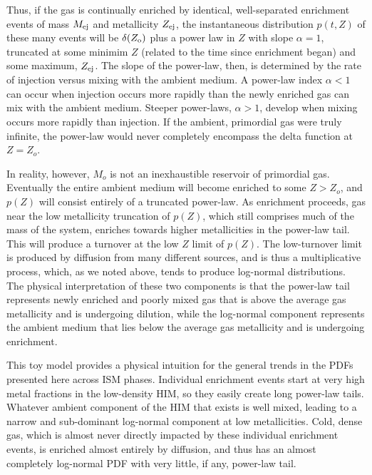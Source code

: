 Thus, if the gas is continually enriched by identical, well-separated enrichment events of mass $M_{\rm ej}$ and metallicity $Z_{\rm ej}$, the instantaneous distribution $p(t,Z)$
of these many events will be $\delta(Z_{\rm o})$ plus a power law in $Z$ with slope $\alpha = 1$, truncated at some minimim $Z$ (related to the time since enrichment began) and some maximum, $Z_{\rm ej}$.
The slope of the power-law, then, is determined by the rate of injection versus mixing with the ambient medium. A power-law index $\alpha < 1$ can occur when injection occurs more rapidly than the newly enriched gas can mix with the ambient medium. Steeper power-laws, $\alpha > 1$, develop when mixing occurs more rapidly than 
         injection.
If the ambient, primordial gas were truly infinite, the power-law would never completely encompass the delta function at $Z = Z_o$.

In reality, however, $M_o$ is not an inexhaustible reservoir of primordial gas. Eventually the entire ambient medium will become enriched to some $Z > Z_o$, and $p(Z)$ will consist entirely of a truncated power-law. As enrichment proceeds, gas near the low metallicity truncation of $p(Z)$, which still comprises much of the mass of the system, enriches towards higher metallicities in the power-law tail. This will produce a turnover at the low $Z$ limit of $p(Z)$. The low-turnover limit is produced by diffusion from many different sources, and is thus a multiplicative process, which, as we noted above, tends to produce log-normal distributions. 
The physical interpretation of these two components is that the power-law tail represents newly enriched and poorly mixed gas that is above the average gas metallicity and is undergoing dilution, while the log-normal component represents the ambient medium that lies below the average gas metallicity and is undergoing enrichment.

This toy model provides a physical intuition for the general trends in the PDFs presented here across ISM phases. 
     Individual enrichment events start at very high metal fractions in the low-density HIM, 
     so they easily create long power-law tails.
Whatever ambient component of the HIM that exists is well mixed, leading to a narrow and sub-dominant log-normal component at low metallicities. Cold, dense gas, which is almost never directly impacted by these individual enrichment events, is enriched almost entirely by diffusion, and thus has an almost completely log-normal PDF with very little, if any, power-law tail.

